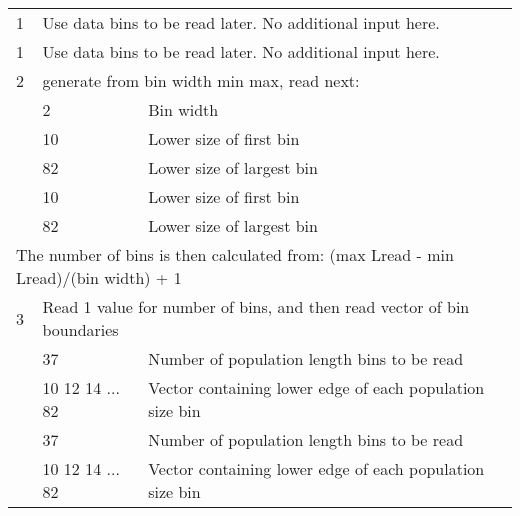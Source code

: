 \begin{center}
		\begin{tabular}{p{2cm} p{5cm} p{8cm}}
		\hline
		1 & \multicolumn{2}{l}{Use data bins to be read later. No additional input here.} \Tstrut\Bstrut\\
		1 & \multicolumn{2}{l}{Use data bins to be read later. No additional input here.} \Tstrut\Bstrut\\
		\hline
		2 & \multicolumn{2}{l}{generate from bin width min max, read next:} \Tstrut\\
		\multirow{4}{2cm}[-0.1cm]{} & 2 & Bin width \\
								    & 10 & Lower size of first bin \\
									& 82 & Lower size of largest bin \\
								    & 10 & Lower size of first bin \\
									& 82 & Lower size of largest bin \\
		\multicolumn{3}{l}{The number of bins is then calculated from: (max Lread - min Lread)/(bin width) + 1}\Bstrut\\
		\hline
		3 & \multicolumn{2}{l}{Read 1 value for number of bins, and then read vector of bin boundaries} \Tstrut\\
		\multirow{2}{2cm}[-0.1cm]{} & 37 & Number of population length bins to be read \\ 
									& 10 12 14 ... 82 & Vector containing lower edge of each population size bin \Bstrut\\
		\multirow{2}{2cm}[-0.1cm]{} & 37 & Number of population length bins to be read \\ 
									& 10 12 14 ... 82 & Vector containing lower edge of each population size bin \Bstrut\\

		\hline									  
	\end{tabular}	
\end{center}


